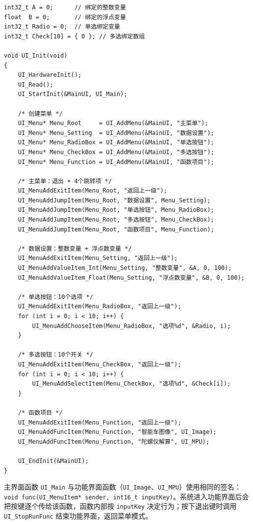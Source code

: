 \begin{lstlisting}[style=c]
int32_t A = 0;      // 绑定的整数变量
float  B = 0;       // 绑定的浮点变量
int32_t Radio = 0;  // 单选绑定变量
int32_t Check[10] = { 0 }; // 多选绑定数组

void UI_Init(void)
{
    UI_HardwareInit();
    UI_Read();
    UI_StartInit(&MainUI, UI_Main);

    /* 创建菜单 */
    UI_Menu* Menu_Root     = UI_AddMenu(&MainUI, "主菜单");
    UI_Menu* Menu_Setting  = UI_AddMenu(&MainUI, "数据设置");
    UI_Menu* Menu_RadioBox = UI_AddMenu(&MainUI, "单选按钮");
    UI_Menu* Menu_CheckBox = UI_AddMenu(&MainUI, "多选按钮");
    UI_Menu* Menu_Function = UI_AddMenu(&MainUI, "函数项目");

    /* 主菜单：退出 + 4个跳转项 */
    UI_MenuAddExitItem(Menu_Root, "返回上一级");
    UI_MenuAddJumpItem(Menu_Root, "数据设置", Menu_Setting);
    UI_MenuAddJumpItem(Menu_Root, "单选按钮", Menu_RadioBox);
    UI_MenuAddJumpItem(Menu_Root, "多选按钮", Menu_CheckBox);
    UI_MenuAddJumpItem(Menu_Root, "函数项目", Menu_Function);

    /* 数据设置：整数变量 + 浮点数变量 */
    UI_MenuAddExitItem(Menu_Setting, "返回上一级");
    UI_MenuAddValueItem_Int(Menu_Setting, "整数变量", &A, 0, 100);
    UI_MenuAddValueItem_Float(Menu_Setting, "浮点数变量", &B, 0, 100);

    /* 单选按钮：10个选项 */
    UI_MenuAddExitItem(Menu_RadioBox, "返回上一级");
    for (int i = 0; i < 10; i++) {
        UI_MenuAddChooseItem(Menu_RadioBox, "选项%d", &Radio, i);
    }

    /* 多选按钮：10个开关 */
    UI_MenuAddExitItem(Menu_CheckBox, "返回上一级");
    for (int i = 0; i < 10; i++) {
        UI_MenuAddSelectItem(Menu_CheckBox, "选项%d", &Check[i]);
    }

    /* 函数项目 */
    UI_MenuAddExitItem(Menu_Function, "返回上一级");
    UI_MenuAddFuncItem(Menu_Function, "智能车图像", UI_Image);
    UI_MenuAddFuncItem(Menu_Function, "陀螺仪解算", UI_MPU);

    UI_EndInit(&MainUI);
}
\end{lstlisting}

主界面函数 \texttt{UI\_Main} 与功能界面函数（\texttt{UI\_Image}、\texttt{UI\_MPU}）使用相同的签名：\texttt{void func(UI\_MenuItem* sender, int16\_t inputKey)}。系统进入功能界面后会把按键逐个传给该函数，函数内部按 \texttt{inputKey} 决定行为；按下退出键时调用 \texttt{UI\_StopRunFunc} 结束功能界面，返回菜单模式。

